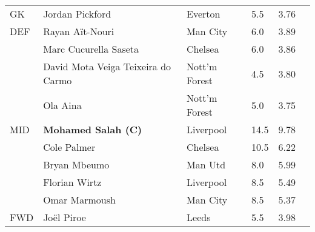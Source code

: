 \begin{table*}[h]
\begin{tabular}{llllrr}
\midrule
GK & Jordan Pickford & Everton & 5.5 & 3.76 \\
DEF & Rayan Aït-Nouri & Man City & 6.0 & 3.89 \\
 & Marc Cucurella Saseta & Chelsea & 6.0 & 3.86 \\
 & David Mota Veiga Teixeira do Carmo & Nott'm Forest & 4.5 & 3.80 \\
 & Ola Aina & Nott'm Forest & 5.0 & 3.75 \\
MID & \textbf{Mohamed Salah (C)} & Liverpool & 14.5 & 9.78 \\
 & Cole Palmer & Chelsea & 10.5 & 6.22 \\
 & Bryan Mbeumo & Man Utd & 8.0 & 5.99 \\
 & Florian Wirtz & Liverpool & 8.5 & 5.49 \\
 & Omar Marmoush & Man City & 8.5 & 5.37 \\
FWD & Joël Piroe & Leeds & 5.5 & 3.98 \\
\bottomrule
\end{tabular}
\end{table*}
